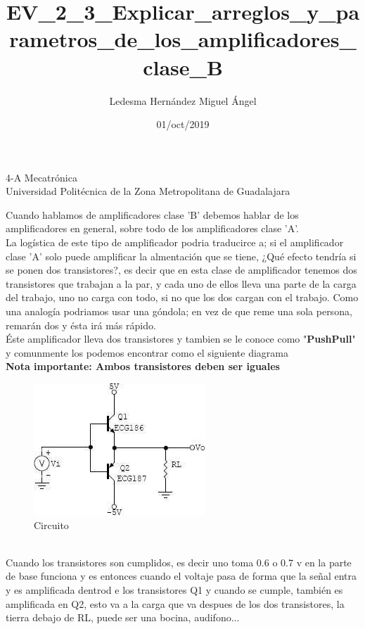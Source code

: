 \documentclass[letterpaper]{article}
\title{EV\_2\_3\_Explicar\_arreglos\_y\_parametros\_de\_los\_amplificadores\_clase\_B}
\author{Ledesma Hernández Miguel Ángel}
\date{01/oct/2019}
\begin{document}
\maketitle
\begin{large}
\begin{center}
\vspace{13cm}
4-A Mecatrónica\\

Universidad Politécnica de la Zona Metropolitana de Guadalajara

\end{center}



\newpage
Cuando hablamos de amplificadores clase 'B' debemos hablar de los amplificadores en general, sobre todo de los amplificadores clase 'A'.\\
La logística de este tipo de amplificador podria traducirce a; si el amplificador clase 'A' solo puede amplificar la almentación que se tiene, ¿Qué efecto tendría si se ponen dos transistores?, es decir que en esta clase de amplificador tenemos dos transistores que trabajan a la par, y cada uno de ellos lleva una parte de la carga del trabajo, uno no carga con todo, si no que los dos cargan con el trabajo. Como una analogía podriamos usar una góndola; en vez de que reme una sola persona, remarán dos y ésta irá más rápido.\\
Éste amplificador lleva dos transistores y tambien se le conoce como "\textbf{PushPull}" y comunmente los podemos encontrar como el siguiente diagrama \\
\textbf{Nota importante: Ambos transistores deben ser iguales}\\
\begin{figure}[hbtp]
\centering
\includegraphics[scale=1]{Imagenes/img1.jpg}
\caption{Circuito}
\end{figure}\\
Cuando los transistores son cumplidos, es decir uno toma 0.6 o 0.7 v en la parte de base funciona y es entonces cuando el voltaje pasa de forma que la señal entra y es amplificada dentrod e los transistores Q1 y cuando se cumple, también es amplificada en Q2, esto va a la carga que va despues de los dos transistores, la tierra debajo de RL, puede ser una bocina, audifono...\\


\end{large}
\end{document}
